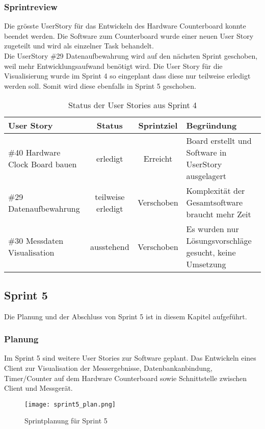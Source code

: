 \subsubsection*{Sprintreview}
Die grösste UserStory für das Entwickeln des Hardware Counterboard konnte beendet werden. Die Software zum Counterboard wurde einer neuen User Story zugeteilt und wird als einzelner Task behandelt.\\
Die UserStory \#29 Datenaufbewahrung wird auf den nächsten Sprint geschoben, weil mehr Entwicklungsaufwand benötigt wird. Die User Story für die Visualisierung wurde im Sprint 4 so eingeplant dass diese nur teilweise erledigt werden soll. Somit wird diese ebenfalls in Sprint 5 geschoben.
\begin{table}[H]
    \centering
    \begin{tabular}{p{4cm}ccp{7cm}}
        \textbf{User Story} &  \textbf{Status} & \textbf{Sprintziel}& \textbf{Begründung}\\\toprule[2pt]
        \#40 Hardware Clock Board bauen & erledigt & Erreicht & Board erstellt und Software in UserStory ausgelagert\\
        \#29 Datenaufbewahrung & teilweise erledigt & Verschoben & Komplexität der Gesamtsoftware braucht mehr Zeit\\
        \#30 Messdaten Visualisation & ausstehend & Verschoben & Es wurden nur Lösungsvorschläge gesucht, keine Umsetzung\\
    \end{tabular}
    \caption{Status der User Stories aus Sprint 4}
\end{table}

\clearpage
\subsection*{Sprint 5}
Die Planung und der Abschluss von Sprint 5 ist in diesem Kapitel aufgeführt.
\subsubsection*{Planung}
Im Sprint 5 sind weitere User Stories zur Software geplant. Das Entwickeln eines Client zur Visualisation der Messergebnisse, Datenbankanbindung, Timer/Counter auf dem Hardware Counterboard sowie Schnittstelle zwischen Client und Messgerät.
\begin{figure}[H]
    \centering
    \texttt{[image: sprint5\_plan.png]}
    \caption{Sprintplanung für Sprint 5}
\end{figure}
